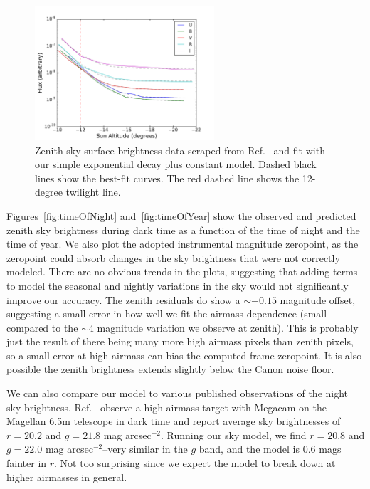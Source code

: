 \documentclass[]{spie}
\begin{document}
\begin{figure}[ht]
  \begin{center}
  \includegraphics[height=5cm]{plots/patatFits.pdf}
  \end{center}
  \caption{Zenith sky surface brightness data scraped from Ref.~ and fit with our simple exponential decay plus constant model. Dashed black lines show the best-fit curves.  The red dashed line shows the 12-degree twilight line.  \label{fig:Patat} }
\end{figure}


Figures~\ref{fig:timeOfNight} and~\ref{fig:timeOfYear} show the observed and predicted zenith sky brightness during dark time as a function of the time of night and the time of year.  We also plot the adopted instrumental magnitude zeropoint, as the zeropoint could absorb changes in the sky brightness that were not correctly modeled.  There are no obvious trends in the plots, suggesting that adding terms to model the seasonal and nightly variations in the sky would not significantly improve our accuracy.  The zenith residuals do show a $\sim-0.15$ magnitude offset, suggesting a small error in how well we fit the airmass dependence (small compared to the $\sim4$ magnitude variation we observe at zenith).  This is probably just the result of there being many more high airmass pixels than zenith pixels, so a small error at high airmass can bias the computed frame zeropoint. It is also possible the zenith brightness extends slightly below the Canon noise floor.

We can also compare our model to various published observations of the night sky brightness.  Ref.~ observe a high-airmass target with Megacam on the Magellan 6.5m telescope in dark time and report average sky brightnesses of $r=20.2$ and $g=21.8$ mag arcsec$^{-2}$.  Running our sky model, we find  $r=20.8$ and $g=22.0$ mag arcsec$^{-2}$--very similar in the $g$ band, and the model is 0.6 mags fainter in $r$.  Not too surprising since we expect the model to break down at higher airmasses in general.
\end{document}
